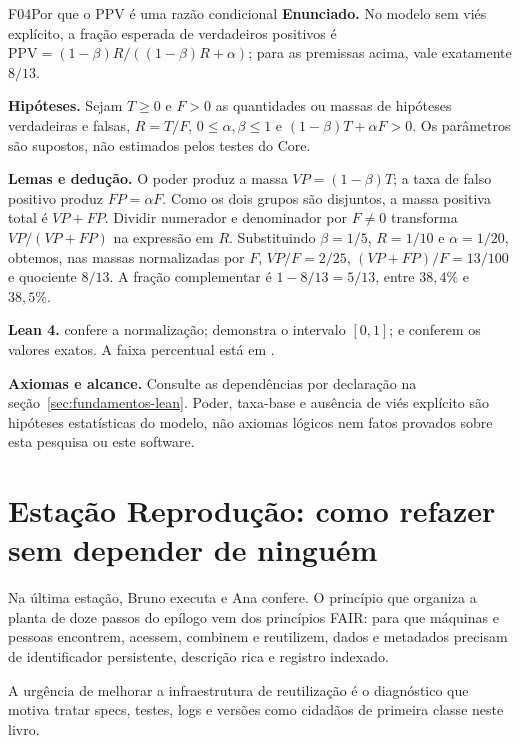 \begin{formalizacao}{F04}{Por que o PPV é uma razão condicional}
\textbf{Enunciado.} No modelo sem viés explícito, a fração esperada de verdadeiros positivos é $\mathrm{PPV}=(1-\beta)R/((1-\beta)R+\alpha)$; para as premissas acima, vale exatamente $8/13$.

\textbf{Hipóteses.} Sejam $T\geq0$ e $F>0$ as quantidades ou massas de hipóteses verdadeiras e falsas, $R=T/F$, $0\leq\alpha,\beta\leq1$ e $(1-\beta)T+\alpha F>0$. Os parâmetros são supostos, não estimados pelos testes do Core.

\textbf{Lemas e dedução.} O poder produz a massa $VP=(1-\beta)T$; a taxa de falso positivo produz $FP=\alpha F$. Como os dois grupos são disjuntos, a massa positiva total é $VP+FP$. Dividir numerador e denominador por $F\ne0$ transforma $VP/(VP+FP)$ na expressão em $R$. Substituindo $\beta=1/5$, $R=1/10$ e $\alpha=1/20$, obtemos, nas massas normalizadas por $F$, $VP/F=2/25$, $(VP+FP)/F=13/100$ e quociente $8/13$. A fração complementar é $1-8/13=5/13$, entre $38{,}4\%$ e $38{,}5\%$.

\textbf{Lean 4.}  confere a normalização;  demonstra o intervalo $[0,1]$;  e  conferem os valores exatos. A faixa percentual está em .

\textbf{Axiomas e alcance.} Consulte as dependências por declaração na seção~\ref{sec:fundamentos-lean}. Poder, taxa-base e ausência de viés explícito são hipóteses estatísticas do modelo, não axiomas lógicos nem fatos provados sobre esta pesquisa ou este software.
\end{formalizacao}

\section{Esta\c{c}\~ao Reprodu\c{c}\~ao: como refazer sem depender de ningu\'em}

Na \'ultima esta\c{c}\~ao, Bruno executa e Ana confere. O princ\'ipio que organiza a planta de doze passos do ep\'ilogo vem dos princ\'ipios FAIR: para que m\'aquinas e pessoas encontrem, acessem, combinem e reutilizem, dados e metadados precisam de identificador persistente, descri\c{c}\~ao rica e registro indexado.

A urg\^encia de melhorar a infraestrutura de reutiliza\c{c}\~ao \'e o diagn\'ostico que motiva tratar specs, testes, logs e vers\~oes como cidad\~aos de primeira classe neste livro.

